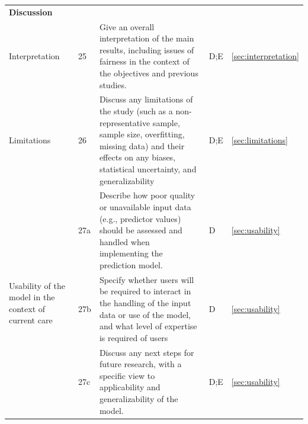 \documentclass{article}
\begin{document}
\begin{longtable}{p{} l p{} l l }
    \multicolumn{3}{l}{\textbf{Discussion}} \\
    Interpretation & 25 & Give an overall interpretation of the main results, including issues of fairness in the context of the objectives and previous studies. & D;E & \ref{sec:interpretation} \\
    
    Limitations & 26 & Discuss any limitations of the study (such as a non-representative sample, sample size, overfitting, missing data) and their effects on any biases, statistical uncertainty, and generalizability & D;E & \ref{sec:limitations} \\
    
    \multirow{3}{4em}{Usability of the model in the context of current care} & 27a &  Describe how poor quality or unavailable input data (e.g., predictor values) should be assessed and handled when implementing the prediction model. & D & \ref{sec:usability} \\
    & 27b & Specify whether users will be required to interact in the handling of the input data or use of the model, and what level of expertise is required of users & D & \ref{sec:usability} \\
    & 27c & Discuss any next steps for future research, with a specific view to applicability and generalizability of the model. & D;E & \ref{sec:usability} \\
         
\end{longtable}

\newpage
\end{document}
